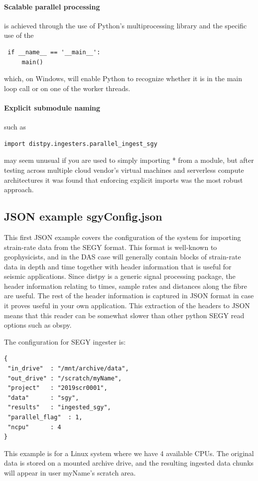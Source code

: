 \paragraph{Scalable parallel processing}
 is achieved through the use of Python's multiprocessing library and the specific use of the 
 \begin{lstlisting}
 if __name__ == '__main__':
     main()
\end{lstlisting}
which, on Windows, will enable Python to recognize whether it is in the main loop call or on one of the worker threads.

\paragraph{Explicit submodule naming}
such as 
\begin{lstlisting}
import distpy.ingesters.parallel_ingest_sgy
\end{lstlisting}
may seem unusual if you are used to simply importing * from a module, but after testing across multiple cloud vendor's virtual machines and 
serverless compute architectures it was found that enforcing explicit imports was the most robust approach.

\subsection{JSON example sgyConfig.json}
This first JSON example covers the configuration of the system for importing strain-rate data from the SEGY format.
This format is well-known to geophysicists, and in the DAS case will generally contain blocks of strain-rate data in depth and time 
together with header information that is useful for seismic applications. Since distpy is a generic signal processing package,
the header information relating to times, sample rates and distances along the fibre are useful. The rest of the header information
is captured in JSON format in case it proves useful in your own application.
This extraction of the headers to JSON means that this reader can be somewhat slower than other python SEGY read options such as obspy.

The configuration for SEGY ingester is:
\begin{lstlisting}
{
 "in_drive"  : "/mnt/archive/data",
 "out_drive" : "/scratch/myName",
 "project"   : "2019scr0001",
 "data"      : "sgy",
 "results"   : "ingested_sgy",
 "parallel_flag"  : 1,
 "ncpu"      : 4
}
\end{lstlisting}
This example is for a Linux system where we have 4 available CPUs. The original data is stored on a mounted archive drive, and the 
resulting ingested data chunks will appear in user myName's scratch area.


